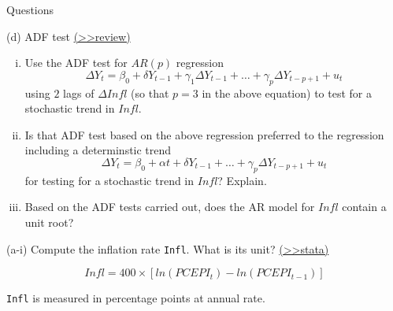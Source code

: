 \documentclass[
  10pt,
  ignorenonframetext,
]{beamer}
\providecommand{\tightlist}{%
  \setlength{\itemsep}{0pt}\setlength{\parskip}{0pt}}
\begin{document}
\begin{frame}{Questions}
\protect\hypertarget{questions-2}{}
\begin{block}{(d) ADF test
\footnotesize\protect\hyperlink{ADFtest}{(\textgreater\textgreater review)}
\normalsize}
\protect\hypertarget{d-adf-test-review}{}
\begin{enumerate}
[i.]
\tightlist
\item
  Use the ADF test for \(AR(p)\) regression \[
  \Delta Y_t = \beta_0 + \delta Y_{t-1} + \gamma_1 \Delta Y_{t-1} +\ldots +\gamma_p \Delta Y_{t-p+1} + u_t
  \] using \(2\) lags of \(\Delta Infl\) (so that \(p = 3\) in the above
  equation) to test for a stochastic trend in \(Infl\).
\end{enumerate}

\vspace{0.8mm}

\begin{enumerate}
[i.]
\setcounter{enumi}{1}
\tightlist
\item
  Is that ADF test based on the above regression preferred to the
  regression including a determinstic trend \[
  \Delta Y_t = \beta_0 + \alpha t + \delta Y_{t-1} + \ldots + \gamma_p \Delta Y_{t-p+1} + u_t 
  \] for testing for a stochastic trend in \(Infl\)? Explain.
\end{enumerate}

\vspace{0.8mm}

\begin{enumerate}
[i.]
\setcounter{enumi}{2}
\tightlist
\item
  Based on the ADF tests carried out, does the AR model for \(Infl\)
  contain a unit root?
\end{enumerate}
\end{block}
\end{frame}

\begin{frame}[fragile]{(a-i) Compute the inflation rate \texttt{Infl}.
What is its unit?}
\protect\hypertarget{Plot-infl-A1}{}
\footnotesize \protect\hyperlink{Plot-infl}{(\textgreater\textgreater stata)}
\normalsize

\[
Infl = 400 \times [ln(PCEPI_t) - ln(PCEPI_{t-1})]
\]

\texttt{Infl} is measured in percentage points at annual rate.
\end{frame}
\end{document}
